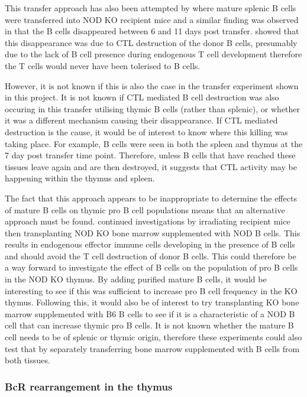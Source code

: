 This transfer approach has also been attempted by \citet{Serreze1998} where mature splenic B cells were transferred into NOD KO recipient mice and a similar finding was observed in that the B cells disappeared between 6 and 11 days post transfer.
\citet{Serreze1998} showed that this disappearance was due to CTL destruction of the donor B cells, presumably due to the lack of B cell presence during endogenous T cell development therefore the T cells would never have been tolerised to B cells.

However, it is not known if this is also the case in the transfer experiment shown in this project.
It is not known if CTL mediated B cell destruction was also occuring in this transfer utilising thymic B cells (rather than splenic), or whether it was a different mechanism causing their disappearance. 
If CTL mediated destruction is the cause, it would be of interest to know where this killing was taking place. 
For example, B cells were seen in both the spleen and thymus at the 7 day post transfer time point.
Therefore, unless B cells that have reached these tissues leave again and are then destroyed, it suggests that CTL activity may be happening within the thymus and spleen. 

The fact that this approach appears to be inappropriate to determine the effects of mature B cells on thymic pro B cell populations means that an alternative approach must be found.
\citet{Serreze1998} continued investigations by irradiating recipient mice then transplanting NOD KO bone marrow supplemented with NOD B cells.
This results in endogenous effector immune cells developing in the presence of B cells and should avoid the T cell destruction of donor B cells.
This could therefore be a way forward to investigate the effect of B cells on the population of pro B cells in the NOD KO thymus.
By adding purified mature B cells, it would be interesting to see if this was sufficient to increase pro B cell frequency in the KO thymus.
Following this, it would also be of interest to try transplanting KO bone marrow supplemented with B6 B cells to see if it is a characteristic of a NOD B cell that can increase thymic pro B cells.
It is not known whether the mature B cell needs to be of splenic or thymic origin, therefore these experiments could also test that by separately transferring bone marrow supplemented with B cells from both tissues.

\subsubsection{BcR rearrangement in the thymus}


